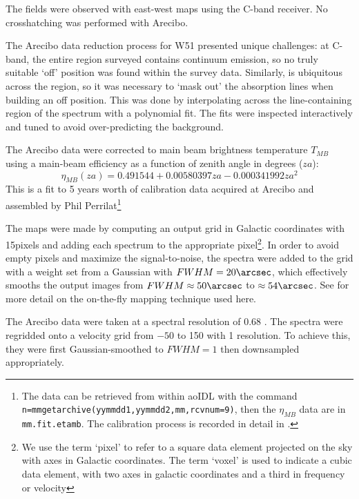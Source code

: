 The fields were observed with east-west maps using the C-band receiver.  No
crosshatching was performed with Arecibo.

The Arecibo data reduction process for W51
presented unique challenges: at C-band, the entire region surveyed contains
continuum emission, so no truly suitable `off' position was found within the
survey data.  Similarly, \formaldehyde is ubiquitous across the region, so it
was necessary to `mask out' the absorption lines when building an off position.
This was done by interpolating across the line-containing region of the
spectrum with a polynomial fit.  The fits were inspected interactively and
tuned to avoid over-predicting the background.

The Arecibo data were corrected to main beam brightness temperature $T_{MB}$
using a main-beam efficiency as a function of zenith angle in degrees ($za$):
$$\eta_{MB}(za) = 0.491544 + 0.00580397 za - 0.000341992 za^2$$
This is a fit to 5 years worth of calibration data acquired at Arecibo and
assembled by Phil Perrilat\footnote{The data can be retrieved from within aoIDL
with the command \texttt{n=mmgetarchive(yymmdd1,yymmdd2,mm,rcvnum=9)}, then
the $\eta_{MB}$ data are in \texttt{mm.fit.etamb}.  The calibration process is
recorded in detail in \citet{Heiles2001a}.}


The maps were made by computing an output grid in Galactic coordinates with
15\arcsec pixels and adding each spectrum to the appropriate pixel\footnote{We
use the term `pixel' to refer to a square data element projected on the sky
with axes in Galactic coordinates.  The term `voxel' is used to indicate a cubic data
element, with two axes in galactic coordinates and a third in frequency or
velocity}.  In order
to avoid empty pixels and maximize the signal-to-noise, the spectra were added
to the grid with a weight set from a Gaussian with $FWHM=20\arcsec$, which
effectively smooths the output images from $FWHM\approx50\arcsec$ to
$\approx54\arcsec$.  See \citet{Mangum2007a} for more detail on the on-the-fly
mapping technique used here.

The Arecibo data were taken at a spectral resolution of 0.68 \kms.  The
spectra were regridded onto a velocity grid from $-50$ to 150 \kms with 1 \kms
resolution.  To achieve this, they were first Gaussian-smoothed to $FWHM=1$
\kms then downsampled appropriately.

